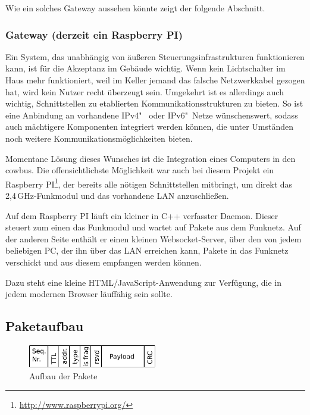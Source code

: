\documentclass{IEEEtran}
\begin{document}
            Wie ein solches Gateway aussehen könnte zeigt der folgende Abschnitt.

        \subsubsection{Gateway (derzeit ein Raspberry PI)}
            Ein System, das unabhängig von äußeren Steuerungsinfrastrukturen
            funktionieren kann, ist für die Akzeptanz im Gebäude wichtig.
            Wenn kein Lichtschalter im Haus mehr funktioniert, weil
            im Keller jemand das falsche Netzwerkkabel gezogen hat,
            wird kein Nutzer recht überzeugt sein.
            Umgekehrt ist es allerdings auch wichtig, Schnittstellen zu
            etablierten Kommunikationsstrukturen zu bieten.
            So ist eine Anbindung an vorhandene IPv4"~ oder IPv6"~Netze
            wünschenswert, sodass auch mächtigere Komponenten integriert werden
            können, die unter Umständen noch weitere Kommunikationsmöglichkeiten
            bieten.

            Momentane Lösung dieses Wunsches ist die Integration eines Computers
            in den cowbus. Die offensichtlichste Möglichkeit war auch bei diesem
            Projekt ein Raspberry PI\footnote{\url{http://www.raspberrypi.org/}},
            der bereits alle nötigen Schnittstellen mitbringt, um direkt das
            2,4\,GHz-Funkmodul und das vorhandene \ac{LAN} anzuschließen.

            Auf dem Raspberry PI läuft ein kleiner in C++ verfasster Daemon.
            Dieser steuert zum einen das Funkmodul und wartet auf Pakete aus
            dem Funknetz.
            Auf der anderen Seite enthält er einen kleinen Websocket-Server,
            über den von jedem beliebigen PC, der ihn über das \ac{LAN}
            erreichen kann, Pakete in das Funknetz verschickt und aus diesem
            empfangen werden können.

            Dazu steht eine kleine HTML/JavaScript-Anwendung zur Verfügung,
            die in jedem modernen Browser läuffähig sein sollte.

    \subsection{Paketaufbau}
            \begin{figure}
            \centering
            \includegraphics[width=0.5\textwidth]{img/paket}
            \caption{Aufbau der Pakete}
            \label{fig:paket}
        \end{figure}
\end{document}
